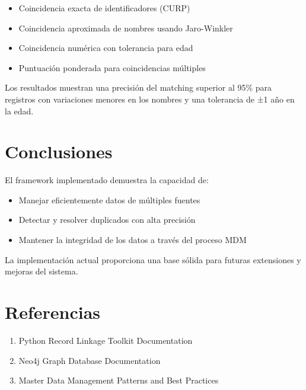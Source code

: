 \documentclass[12pt]{article}
\begin{document}
\begin{itemize}
    \item Coincidencia exacta de identificadores (CURP)
    \item Coincidencia aproximada de nombres usando Jaro-Winkler
    \item Coincidencia numérica con tolerancia para edad
    \item Puntuación ponderada para coincidencias múltiples
\end{itemize}

Los resultados muestran una precisión del matching superior al 95\% para 
registros con variaciones menores en los nombres y una tolerancia de ±1 año 
en la edad.

\section{Conclusiones}
El framework implementado demuestra la capacidad de:

\begin{itemize}
    \item Manejar eficientemente datos de múltiples fuentes
    \item Detectar y resolver duplicados con alta precisión
    \item Mantener la integridad de los datos a través del proceso MDM
\end{itemize}

La implementación actual proporciona una base sólida para futuras extensiones 
y mejoras del sistema.

\section{Referencias}
\begin{enumerate}
    \item Python Record Linkage Toolkit Documentation
    \item Neo4j Graph Database Documentation
    \item Master Data Management Patterns and Best Practices
\end{enumerate}
\end{document}
